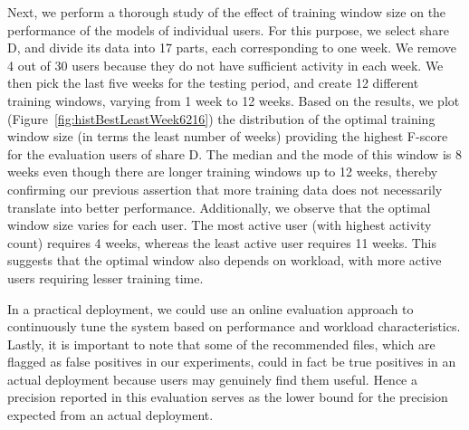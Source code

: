 Next, we perform a thorough study of the effect of training window
size on the performance of the models of individual users.  For this
purpose, we select share D, and divide its data into 17
parts, each corresponding to one week.  We remove 4 out of 30 users
because they do not have sufficient activity in each week.  We then
pick the last five weeks for the testing period, and create 12
different training windows, varying from 1 week to 12 weeks.  Based on
the results, we plot (Figure~\ref{fig:histBestLeastWeek6216}) the
distribution of the optimal training window size (in terms the least
number of weeks) providing the highest F-score for the evaluation
users of share D.  The median and the mode of this window is 8
weeks even though there are longer training windows up to 12 weeks,
thereby confirming our previous assertion that more training data does
not necessarily translate into better performance.  Additionally, we observe that
the optimal window size varies for each user.  The most active user
(with highest activity count) requires 4 weeks, whereas the least
active user requires 11 weeks.  This suggests that the optimal window
also depends on workload, with more active users requiring lesser
training time.

In a practical deployment, we could use an online evaluation approach
to continuously tune the system based on performance and workload
characteristics.  Lastly, it is important to note that some of the
recommended files, which are flagged as false positives in our
experiments, could in fact be true positives in an actual deployment
because users may genuinely find them useful.  Hence a precision
reported in this evaluation serves as the lower bound for the
precision expected from an actual deployment.


